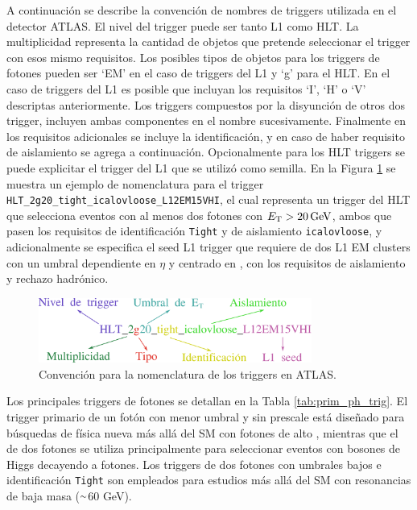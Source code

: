A continuación se describe la convención de nombres de triggers utilizada en el detector ATLAS.
El nivel del trigger puede ser tanto L1 como HLT. La multiplicidad representa la cantidad de objetos que pretende seleccionar el trigger con esos mismo requisitos. Los posibles tipos de objetos para los triggers de fotones pueden ser `EM' en el caso de triggers del L1 y `g' para el HLT. En el caso de triggers del L1 es posible que incluyan los requisitos `I', `H' o `V' descriptas anteriormente. Los triggers compuestos por la disyunción de otros dos trigger, incluyen ambas componentes en el nombre sucesivamente. Finalmente en los requisitos adicionales se incluye la identificación, y en caso de haber requisito de aislamiento se agrega a continuación. Opcionalmente para los HLT triggers se puede explicitar el trigger del L1 que se utilizó como semilla. En la Figura \ref{fig:trigger_name} se muestra un ejemplo de nomenclatura para el trigger \texttt{HLT\_2g20\_tight\_icalovloose\_L12EM15VHI}, el cual representa un trigger del HLT que selecciona eventos con al menos dos fotones con $E_{\text{T}}>20\,\text{GeV}$, ambos que pasen los requisitos de identificación \texttt{Tight} y de aislamiento \texttt{icalovloose}, y adicionalmente se especifica el seed L1 trigger que requiere de dos L1 EM clusters con un umbral dependiente en $\eta$ y centrado en , con los requisitos de aislamiento y rechazo hadrónico.

\begin{figure}
  \centering
  \includegraphics[width=0.8\textwidth]{images/trigger/trigger_name.pdf}
  \caption{Convención para la nomenclatura de los triggers en ATLAS.}
  \label{fig:trigger_name}
\end{figure}

Los principales triggers de fotones se detallan en la Tabla \ref{tab:prim_ph_trig}. El trigger primario de un fotón con menor umbral y sin prescale 
está diseñado para búsquedas de física nueva más allá del SM con fotones de alto \ET, mientras que el de dos fotones se utiliza principalmente para seleccionar eventos con bosones de Higgs decayendo a fotones. Los triggers de dos fotones con umbrales bajos e identificación \texttt{Tight} son empleados para estudios más allá del SM con resonancias de baja masa ({$\smallsim$}60 GeV).



